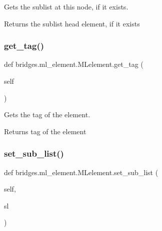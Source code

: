 Gets the sublist at this node, if it exists. 

\begin{DoxyReturn}{Returns}
the sublist head element, if it exists 
\end{DoxyReturn}
\mbox{\label{classbridges_1_1ml__element_1_1_m_lelement_afd872697e67a92dc4f4ef2f7bd7d249d}} 
\subsubsection{\texorpdfstring{get\+\_\+tag()}{get\_tag()}}
{\footnotesize\ttfamily def bridges.\+ml\+\_\+element.\+M\+Lelement.\+get\+\_\+tag (\begin{DoxyParamCaption}\item[{}]{self }\end{DoxyParamCaption})}



Gets the tag of the element. 

\begin{DoxyReturn}{Returns}
tag of the element 
\end{DoxyReturn}
\mbox{\label{classbridges_1_1ml__element_1_1_m_lelement_a578cd6c05bb6f38939bd41d0e1c93613}} 
\subsubsection{\texorpdfstring{set\+\_\+sub\+\_\+list()}{set\_sub\_list()}}
{\footnotesize\ttfamily def bridges.\+ml\+\_\+element.\+M\+Lelement.\+set\+\_\+sub\+\_\+list (\begin{DoxyParamCaption}\item[{}]{self,  }\item[{}]{sl }\end{DoxyParamCaption})}



